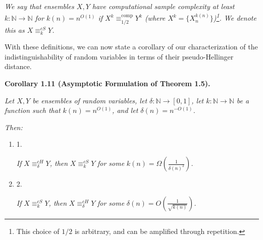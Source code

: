 \emph{We say that ensembles $X,Y$ have computational sample complexity at least $k:\mathbb{N}\rightarrow\mathbb{N}$ for $k(n)=n^{O(1)}$ if $X^{k}\equiv^{\mathrm{comp}}_{1/2}Y^{k}$ (where $X^{k}=\{X_{n}^{k(n)}\}$)\footnote{This choice of $1/2$ is arbitrary, and can be amplified through repetition.}. We denote this as $X\equiv_{k}^{cS}Y$.}\par






With these definitions, we can now state a corollary of our characterization of the indistinguishability of random variables in terms of their pseudo-Hellinger distance.\par





\par\medskip\noindent\textbf{
\textbf{Corollary 1.11}\textbf{ }(Asymptotic Formulation of Theorem 1.5)\textbf{.}
}\par



\emph{Let $X,Y$ be ensembles of random variables, let $\delta:\mathbb{N}\rightarrow[0,1]$, let $k:\mathbb{N}\rightarrow\mathbb{N}$ be a function such that $k(n)=n^{O(1)}$, and let $\delta(n)=n^{-O(1)}$.}\par




\emph{Then:}\par


\begin{enumerate}


\item[] 
1. 


\emph{If }$X\equiv_{\delta}^{cH}Y$\emph{, then }$X\equiv_{k}^{cS}Y$\emph{ for some }$k(n)=\Omega\left(\frac{1}{\delta(n)^{2}}\right)$\emph{.}\par





\item[] 
2. 


\emph{If }$X\equiv_{k}^{cS}Y$\emph{, then }$X\equiv^{cH}_{\delta}Y$\emph{ for some }$\delta(n)=O\left(\frac{1}{\sqrt{k(n)}}\right)$\emph{.}\par





\end{enumerate}



